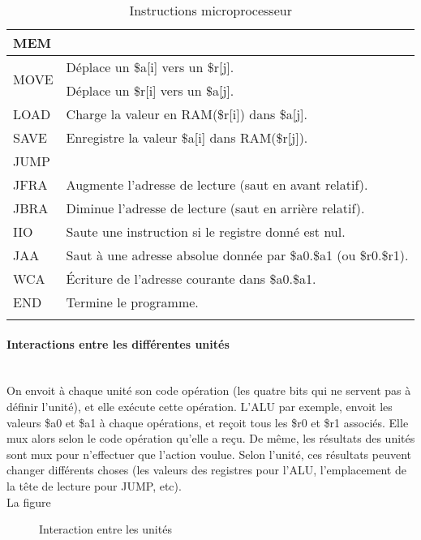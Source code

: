 \documentclass{article}
\begin{document}
\begin{savenotes}
\begin{longtable}{|l|l|}
  \hline\hline
  \multicolumn{2}{|l|}{MEM} \\
  \hline
  \multirow{2}{*}{MOVE} & Déplace un \$a[i] vers un \$r[j]. \\
                        & Déplace un \$r[i] vers un \$a[j]. \\
  LOAD                  & Charge la valeur en RAM(\$r[i]) dans \$a[j]. \\
  SAVE                  & Enregistre la valeur \$a[i] dans RAM(\$r[j]). \\

  \hline\hline
  \multicolumn{2}{|l|}{JUMP} \\
  \hline
  JFRA & Augmente l'adresse de lecture (saut en avant relatif). \\
  JBRA & Diminue l'adresse de lecture (saut en arrière relatif). \\
  IIO  & Saute une instruction si le registre donné est nul. \\
  JAA  & Saut à une adresse absolue donnée par \$a0.\$a1 (ou \$r0.\$r1). \\
  WCA  & \'Ecriture de l'adresse courante dans \$a0.\$a1. \\
  END  & Termine le programme. \\
  \hline

\caption{Instructions microprocesseur}
\end{longtable}
\end{savenotes}

\paragraph{Interactions entre les différentes unités}~\\
On envoit à chaque unité son code opération (les quatre bits qui ne servent pas
à définir l'unité), et elle exécute cette opération. L'ALU par exemple, envoit
les valeurs \$a0 et \$a1 à chaque opérations, et reçoit tous les \$r0 et \$r1
associés. Elle mux alors selon le code opération qu'elle a reçu. De même, les
résultats des unités sont mux pour n'effectuer que l'action voulue. Selon
l'unité, ces résultats peuvent changer différents choses (les valeurs des
registres pour l'ALU, l'emplacement de la tête de lecture pour JUMP, etc).\\
La figure
\begin{figure}[h]
\caption{Interaction entre les unités}
\end{figure}
\end{document}
